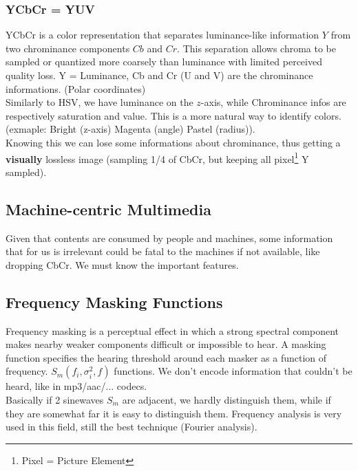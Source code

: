 \subsubsection{YCbCr = YUV}
YCbCr is a color representation that separates luminance-like information $Y$ from two chrominance components $Cb$ and $Cr$. This separation allows chroma to be sampled or quantized more coarsely than luminance with limited perceived quality loss.
Y = Luminance, Cb and Cr (U and V) are the chrominance informations. (Polar coordinates)\\
Similarly to HSV, we have luminance on the $z$-axis, while Chrominance infos are respectively saturation and value. This is a more natural way to identify colors. (exmaple: Bright (z-axis) Magenta (angle) Pastel (radius)).\\
Knowing this we can lose some informations about chrominance, thus getting a \textbf{visually} lossless image (sampling 1/4 of CbCr, but keeping all pixel\footnote{Pixel = Picture Element} Y sampled).
\subsection{Machine-centric Multimedia}
Given that contents are consumed by people and machines, some information that for us is irrelevant could be fatal to the machines if not available, like dropping CbCr. We must know the important features.
\subsection{Frequency Masking Functions}
Frequency masking is a perceptual effect in which a strong spectral component makes nearby weaker components difficult or impossible to hear. A masking function specifies the hearing threshold around each masker as a function of frequency.
$S_m(f_i, \sigma_i^2, f)$ functions. We don't encode information that couldn't be heard, like in mp3/aac/... codecs.\\
Basically if 2 sinewaves $S_m$ are adjacent, we hardly distinguish them, while if they are somewhat far it is easy to distinguish them.
Frequency analysis is very used in this field, still the best technique (Fourier analysis).
